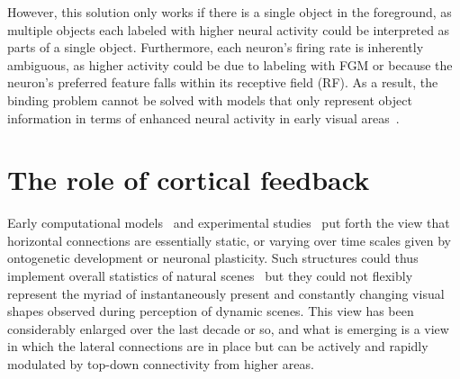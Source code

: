 However, this solution only works if there is a single object in the foreground, as multiple objects each labeled with higher neural activity could be interpreted as parts of a single object. Furthermore, each neuron's firing rate is inherently ambiguous, as higher activity could be due to labeling with FGM or because the neuron's preferred feature falls within its receptive field (RF). As a result, the binding problem cannot be solved with models that only represent object information in terms of enhanced neural activity in early visual areas~\citep{Niebur00a}.

\section{The role of cortical feedback}

%
Early computational models~\citep{Stemmler_etal95b} and experimental studies~\citep{Simonotto_etal97,Polat_etal98,Chatterjee_etal11,Xie_etal14} put forth the view that horizontal connections
are essentially static, or varying over time scales given by ontogenetic development or neuronal plasticity. Such structures could thus implement overall statistics of natural scenes~\citep[like circular structures, e.g.][]{Sigman_etal01} but they could not flexibly represent the myriad of instantaneously present and constantly changing visual shapes observed during perception of dynamic scenes. This view has been considerably enlarged over the last decade or so, and what is emerging is a view in which the lateral connections are in place but can be actively and rapidly modulated by top-down connectivity from higher areas.

